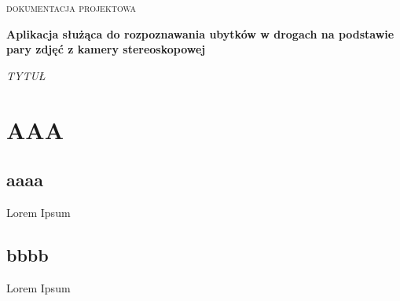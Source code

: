 \documentclass[11pt, a4paper]{article}
\newcommand{\FullTitle}{Aplikacja służąca do rozpoznawania ubytków w drogach na podstawie pary zdjęć z kamery stereoskopowej}
\newcommand{\DocType}{TYTUŁ}
\begin{document}
\begin{titlepage}
    \centering
    
    \vspace*{2cm}
    
    {\scshape\Large dokumentacja projektowa \par}
    \vspace{1.5cm}
    
    {\Huge\bfseries\textcolor{ProjectColor}{\FullTitle} \par}
    \vspace{2cm}
    
    {\Large\itshape \DocType \par}
    \vspace{2cm}
    
    \vfill
    
\end{titlepage}

\newpage

\section{AAA}
\subsection{aaaa}
Lorem Ipsum

\subsection{bbbb}
Lorem Ipsum
\end{document}

